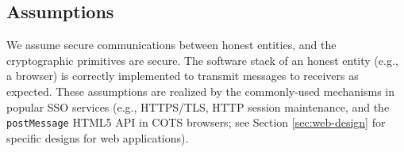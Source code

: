 





%


\subsection{Assumptions}
We assume secure communications between honest entities, and the cryptographic primitives are secure. The software stack of an honest entity (e.g., a browser) is correctly implemented to transmit messages to receivers as expected.
These assumptions are realized by the commonly-used mechanisms in popular SSO services
 \cite{OpenIDConnect, rfc6749, SAML,GoogleIdIntegrate,de2014oauth,FettKS14,BrowserID,uber} (e.g., HTTPS/TLS, HTTP session maintenance, and the \verb+postMessage+ HTML5 API in COTS browsers; see Section \ref{sec:web-design} for specific designs for web applications).

